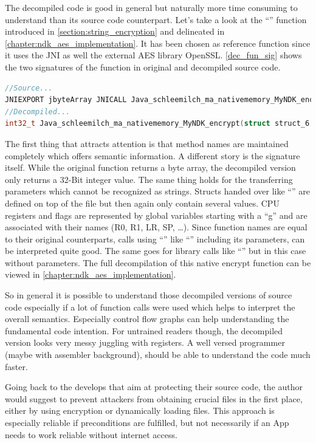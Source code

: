 The decompiled code is good in general but naturally more time
consuming to understand than its source code counterpart.
Let's take a look at the ``'' function
introduced in \autoref{section:string_encryption} and delineated
in \autoref{chapter:ndk_aes_implementation}.
It has been chosen as reference function since it uses the
JNI as well the external AES library OpenSSL.
\autoref{dec_fun_sig} shows the two signatures of the function
in original and decompiled source code.
\begin{lstlisting}[language=C++, caption=Original vs Decompiled JNI Method Signatures, label=dec_fun_sig]
//Source...
JNIEXPORT jbyteArray JNICALL Java_schleemilch_ma_nativememory_MyNDK_encrypt (JNIEnv *env, jobject obj, jstring str, jstring jkey);
//Decompiled...
int32_t Java_schleemilch_ma_nativememory_MyNDK_encrypt(struct struct_6 a1, int32_t a2, int32_t a3, int32_t a4, int32_t a5, int32_t a6, int32_t a7, int32_t a8, int32_t a9, int32_t a10, int32_t a11);
\end{lstlisting}
The first thing that attracts attention is that method names are maintained
completely which offers semantic information. A different story is the
signature itself. While the original function returns a byte array,
the decompiled version only returns a 32-Bit integer value. The same thing
holds for the transferring parameters which cannot be recognized as
strings. Structs handed over like ``'' are defined
on top of the file but then again only contain several
 values. CPU registers and flags are represented
by global variables starting with a ``g'' and are associated
with their names (R0, R1, LR, SP, \ldots).
Since function names are equal to their original counterparts,
calls using ``'' like ``'' including its parameters, can be interpreted quite good.
The same goes for library calls like ``''
but in this case without parameters.
The full decompilation of this native encrypt function can be
viewed in \autoref{chapter:ndk_aes_implementation}.

So in general it is possible to understand those decompiled versions
of source code especially if a lot of function
calls were used which helps to interpret the overall semantics. Especially
control flow graphs can help understanding the fundamental code intention.
For untrained readers though, the decompiled version looks very messy
juggling with registers. A well versed programmer (maybe with assembler background), should be able to understand the code much faster.

Going back to the develops that aim at protecting their source code, the author would suggest to prevent attackers from obtaining crucial files in the first place, either by using encryption or dynamically loading files.
This approach is especially reliable if preconditions are fulfilled, but not necessarily if an App needs to work reliable without internet access.

